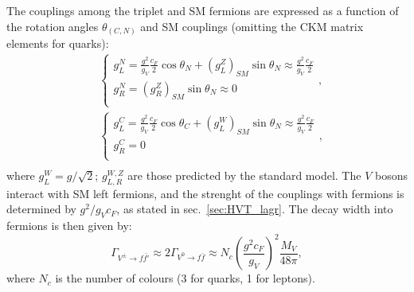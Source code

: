 The couplings among the triplet and SM fermions are expressed as a function of the rotation angles $\theta_{(C,N)}$ and SM couplings (omitting the CKM matrix elements for quarks):
\begin{equation}
\begin{split}
&
\left\{
\begin{array}{l}
g_L^N = \frac{g^2}{g_V} \frac{c_F}{2} \cos{{\theta}_N} + \left( g_L^Z \right)_{SM} \sin{{\theta}_N} \approx \frac{g^2}{g_V} \frac{c_F}{2} \\
g_R^N = \left( g_R^Z \right)_{SM} \sin{{\theta}_N} \approx 0\\
\end{array}
\right.
,\\
&
\left\{
\begin{array}{l}
g_L^C = \frac{g^2}{g_V} \frac{c_F}{2} \cos{{\theta}_C} + \left( g_L^W \right)_{SM} \sin{{\theta}_N} \approx \frac{g^2}{g_V} \frac{c_F}{2} \\
g_R^C = 0\\
\end{array}
\right.
,\\
\end{split}
\label{eq:HVT_couplings}
\end{equation}
where $g_L^W = g/\sqrt{2}$; $g_{L,R}^{W,Z}$ are those predicted by the standard model. The $V$ bosons interact with SM left fermions, and the strenght of the couplings with fermions is determined by $g^2/g_V c_F$, as stated in sec.~\ref{sec:HVT_lagr}. The decay width into fermions is then given by:
\begin{equation}
\Gamma_{V^{\pm} \rightarrow f \bar{f'}} \approx 2 \Gamma_{V^{0} \rightarrow f \bar{f}} \approx N_c {\left( \frac{g^2 c_F}{g_V}\right)}^2 \frac{M_V}{48 \pi},
\label{eq:HVT_width_fermions}
\end{equation}
where $N_c$ is the number of colours (3 for quarks, 1 for leptons).

